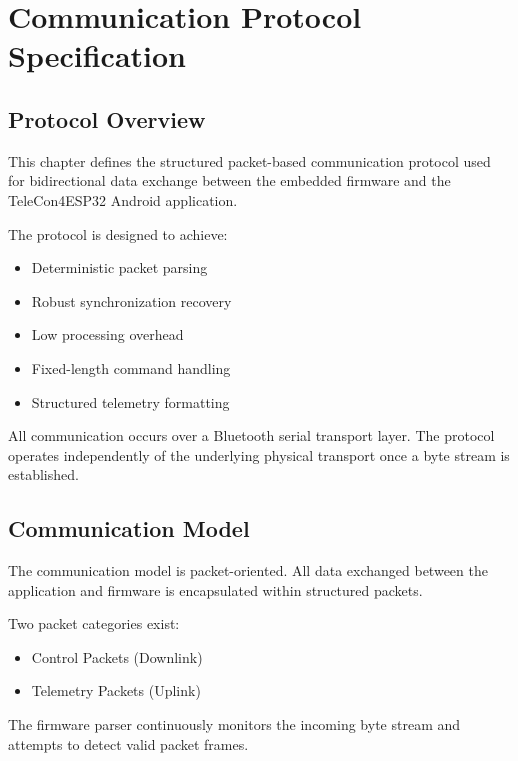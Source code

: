 \chapter{Communication Protocol Specification}

\section{Protocol Overview}

This chapter defines the structured packet-based communication protocol used for bidirectional data exchange between the embedded firmware and the TeleCon4ESP32 Android application.

The protocol is designed to achieve:

\begin{itemize}
	\item Deterministic packet parsing
	\item Robust synchronization recovery
	\item Low processing overhead
	\item Fixed-length command handling
	\item Structured telemetry formatting
\end{itemize}

All communication occurs over a Bluetooth serial transport layer. The protocol operates independently of the underlying physical transport once a byte stream is established.


\section{Communication Model}

The communication model is packet-oriented.  
All data exchanged between the application and firmware is encapsulated within structured packets.

Two packet categories exist:

\begin{itemize}
	\item Control Packets (Downlink)
	\item Telemetry Packets (Uplink)
\end{itemize}

The firmware parser continuously monitors the incoming byte stream and attempts to detect valid packet frames.



